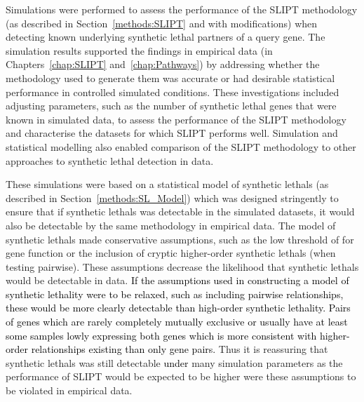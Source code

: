 Simulations were performed to assess the performance of the \gls{SLIPT} methodology (as described in Section~\ref{methods:SLIPT} and with modifications) when detecting known underlying \gls{synthetic lethal} partners of a query gene. The simulation results supported the findings in empirical data (in Chapters~\ref{chap:SLIPT} and~\ref{chap:Pathways}) by addressing whether the methodology used to generate them was accurate or had desirable statistical performance in controlled simulated conditions. These investigations included adjusting parameters, such as the number of \gls{synthetic lethal} genes that were known in simulated data, to assess the performance of the \gls{SLIPT} methodology and characterise the datasets for which \gls{SLIPT} performs well. Simulation and statistical modelling also enabled comparison of the \gls{SLIPT} methodology to other approaches to \gls{synthetic lethal} detection in  data.

These simulations were based on a statistical model of \glspl{synthetic lethal} (as described in Section~\ref{methods:SL_Model}) which was designed stringently to ensure that if \glspl{synthetic lethal} was detectable in the simulated datasets, it would also be detectable by the same methodology in empirical  data. The model of \glspl{synthetic lethal} made conservative assumptions, such as the low threshold of  for gene function or the inclusion of cryptic higher-order \glspl{synthetic lethal} (when testing pairwise). These assumptions decrease the likelihood that \glspl{synthetic lethal} would be detectable in  data. \textcolor{black}{If the assumptions used in constructing a model of synthetic lethality were to be relaxed, such as including pairwise relationships, these would be more clearly detectable than high-order synthetic lethality. Pairs of genes which are rarely completely mutually exclusive or usually have at least some samples lowly expressing both genes which is more consistent with higher-order relationships existing than only gene pairs.} Thus it is reassuring that \glspl{synthetic lethal} was still detectable \textcolor{black}{under} many simulation parameters as the performance of \gls{SLIPT} would be expected to be higher were these assumptions to be violated in empirical data.


